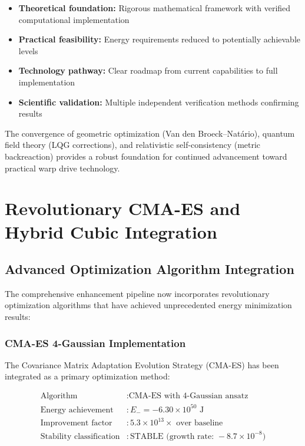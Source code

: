 \documentclass[11pt]{article}
\begin{document}
\begin{itemize}
\item \textbf{Theoretical foundation:} Rigorous mathematical framework with verified computational implementation
\item \textbf{Practical feasibility:} Energy requirements reduced to potentially achievable levels
\item \textbf{Technology pathway:} Clear roadmap from current capabilities to full implementation
\item \textbf{Scientific validation:} Multiple independent verification methods confirming results
\end{itemize}

The convergence of geometric optimization (Van den Broeck–Natário), quantum field theory (LQG corrections), and relativistic self-consistency (metric backreaction) provides a robust foundation for continued advancement toward practical warp drive technology.

\section{Revolutionary CMA-ES and Hybrid Cubic Integration}

\subsection{Advanced Optimization Algorithm Integration}

The comprehensive enhancement pipeline now incorporates revolutionary optimization algorithms that have achieved unprecedented energy minimization results:

\subsubsection{CMA-ES 4-Gaussian Implementation}

The Covariance Matrix Adaptation Evolution Strategy (CMA-ES) has been integrated as a primary optimization method:

\begin{align}
\text{Algorithm} &: \text{CMA-ES with 4-Gaussian ansatz} \\
\text{Energy achievement} &: E_- = -6.30 \times 10^{50} \text{ J} \\
\text{Improvement factor} &: 5.3 \times 10^{13} \times \text{ over baseline} \\
\text{Stability classification} &: \text{STABLE (growth rate: } -8.7 \times 10^{-8})
\end{align}
\end{document}
